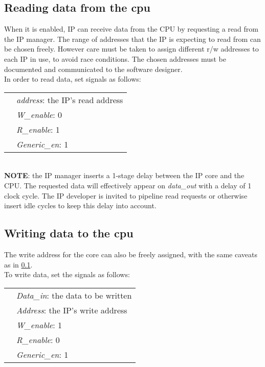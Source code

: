 \subsection{Reading data from the cpu}\label{4.1}
When it is enabled, IP can receive data from the CPU by requesting a read from the IP manager. The range of addresses that the IP is expecting to read from can be chosen freely. However care must be taken to assign different r/w addresses to each IP in use, to avoid race conditions. The chosen addresses must be documented and communicated to the software designer.\vspace{0.5cm}\\
In order to read data, set signals as follows:\vspace{0.1cm}\\
\begin{tabular}{ p{0.7cm} p{14 cm} }\\
&\textit{address}: the IP's read address\\
&\textit{W\_enable}: 0\\
&\textit{R\_enable}: 1\\
&\textit{Generic\_en}: 1\\
\end{tabular}
\vspace{0.2cm}\\
\textbf{NOTE}: the IP manager inserts a 1-stage delay between the IP core and the CPU. The requested data will effectively appear on \textit{data\_out} with a delay of 1 clock cycle. The IP developer is invited to pipeline read requests or otherwise insert idle cycles to keep this delay into account.
\subsection{Writing data to the cpu} \label{4.2}
The write address for the core can also be freely assigned, with the same caveats as in \ref{4.1}. \vspace{0.5cm}\\To write data, set the signals as follows:\vspace{0.1cm}\\
\begin{tabular}{ p{0.7cm} p{14 cm} }\\
	&\textit{Data\_in}: the data to be written\\
&\textit{Address}: the IP's write address\\
&\textit{W\_enable}: 1\\
&\textit{R\_enable}: 0\\
&\textit{Generic\_en}: 1\\
\end{tabular}

